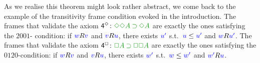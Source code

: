 
As we realise this theorem might look rather abstract, we come back to the example of the transitivity frame condition evoked in the introduction.
The frames that validate the axiom $\ax{4^{\DIA}} \colon \fm{\DIA\DIA A \IMP \DIA A}$ are exactly the ones satisfying the $2001$- condition: if ${\color{blue}{w}}R{\color{blue}{v}}$ and ${\color{blue}{v}}R{\color{blue}{u}}$, there exists ${\color{blue}{u'}}$ s.t.~${\color{blue}{u}}\le{{\color{blue}{u'}}}$ and ${\color{blue}{w}}R{\color{blue}{u'}}$.
The frames that validate the axiom $\ax{4^{\BOX}} \colon \fm{\BOX A \IMP \BOX \BOX A}$ are exactly the ones satisfying the $0120$-condition: if ${\color{blue}{w}}R{\color{blue}{v}}$ and ${\color{blue}{v}}R{\color{blue}{u}}$, there exists ${\color{blue}{w'}}$ s.t.~${\color{blue}{w}}\le{{\color{blue}{w'}}}$ and ${\color{blue}{w'}}R{\color{blue}{u}}$.


